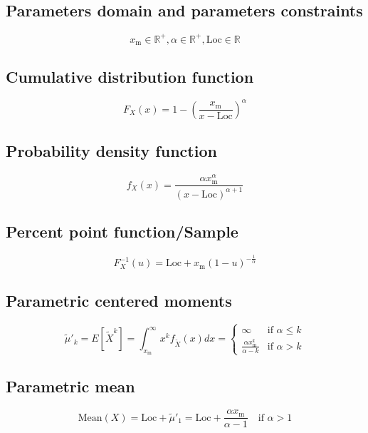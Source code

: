\documentclass{article}
\begin{document}
\subsection{Parameters domain and parameters constraints}
\begin{equation*} x_\mathrm{m}\in\mathbb{R}^{+}, \alpha\in\mathbb{R}^{+}, \text{Loc}\in\mathbb{R} \end{equation*}
\subsection{Cumulative distribution function}
\begin{equation*} F_{X}\left(x\right)=1-\left(\frac{x_\mathrm{m}}{x-\text{Loc}}\right)^\alpha \end{equation*}
\subsection{Probability density function}
\begin{equation*} f_{X}\left(x\right)=\frac{\alpha x_\mathrm{m}^\alpha}{(x-\text{Loc})^{\alpha+1}} \end{equation*}
\subsection{Percent point function/Sample}
\begin{equation*} F^{-1}_{X}\left(u\right)=\text{Loc}+x_\mathrm{m} {(1-u)}^{-\frac{1}{\alpha}} \end{equation*}
\subsection{Parametric centered moments}
\begin{equation*} \tilde{\mu}'_{k}=E[\tilde{X}^k]=\int_{x_\mathrm{m}}^{\infty}x^{k}f_{\tilde{X}}\left(x\right)dx=\left\{\begin{array}{cl}\infty & \text{if } \alpha\le k \\ \frac{\alpha x_\mathrm{m}^k}{\alpha-k} & \text{if } \alpha>k \end{array} \right. \end{equation*}
\subsection{Parametric mean}
\begin{equation*} \mathrm{Mean}(X)=\text{Loc}+\tilde{\mu}'_{1}=\text{Loc}+\dfrac{\alpha x_\mathrm{m}}{\alpha-1} \quad \text{if }\alpha>1 \end{equation*}
\end{document}
